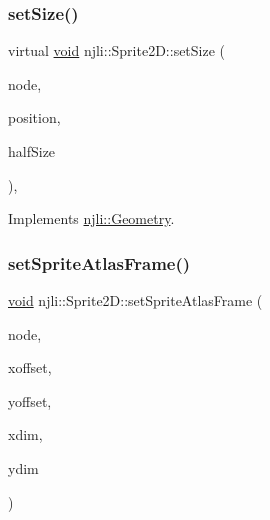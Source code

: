 \subsubsection{\texorpdfstring{set\+Size()}{setSize()}}
{\footnotesize\ttfamily virtual \mbox{\hyperlink{_thread_8h_af1e856da2e658414cb2456cb6f7ebc66}{void}} njli\+::\+Sprite2\+D\+::set\+Size (\begin{DoxyParamCaption}\item[{\mbox{\hyperlink{classnjli_1_1_node}{Node}} $\ast$}]{node,  }\item[{const bt\+Vector3 \&}]{position,  }\item[{const \mbox{\hyperlink{_util_8h_a5f6906312a689f27d70e9d086649d3fd}{f32}}}]{half\+Size }\end{DoxyParamCaption})\hspace{0.3cm}{\ttfamily [protected]}, {\ttfamily [virtual]}}



Implements \mbox{\hyperlink{classnjli_1_1_geometry_a64c12722f84add665776c2b9400108fd}{njli\+::\+Geometry}}.

\mbox{\label{classnjli_1_1_sprite2_d_a0ff724f572e6768e9d1b20b6898af095}} 
\subsubsection{\texorpdfstring{set\+Sprite\+Atlas\+Frame()}{setSpriteAtlasFrame()}\hspace{0.1cm}{\footnotesize\ttfamily [1/5]}}
{\footnotesize\ttfamily \mbox{\hyperlink{_thread_8h_af1e856da2e658414cb2456cb6f7ebc66}{void}} njli\+::\+Sprite2\+D\+::set\+Sprite\+Atlas\+Frame (\begin{DoxyParamCaption}\item[{\mbox{\hyperlink{classnjli_1_1_node}{Node}} $\ast$}]{node,  }\item[{const \mbox{\hyperlink{_util_8h_a5f6906312a689f27d70e9d086649d3fd}{f32}} \&}]{xoffset,  }\item[{const \mbox{\hyperlink{_util_8h_a5f6906312a689f27d70e9d086649d3fd}{f32}} \&}]{yoffset,  }\item[{const \mbox{\hyperlink{_util_8h_a5f6906312a689f27d70e9d086649d3fd}{f32}} \&}]{xdim,  }\item[{const \mbox{\hyperlink{_util_8h_a5f6906312a689f27d70e9d086649d3fd}{f32}} \&}]{ydim }\end{DoxyParamCaption})}

